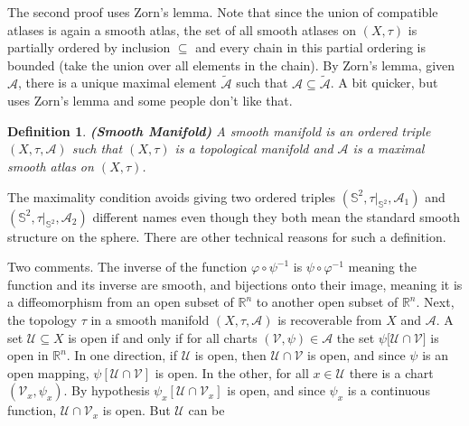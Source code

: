 \documentclass{article}
\theoremstyle{plain}
\theoremstyle{normal}
\newtheorem{definition}{Definition}[section]
\begin{document}
        \par\hfill\par
        The second proof uses Zorn's lemma. Note that since the union of
        compatible atlases is again a smooth atlas, the set of all smooth
        atlases on $(X,\tau)$ is partially ordered by inclusion $\subseteq$
        and every chain in this partial ordering is bounded (take the union
        over all elements in the chain). By Zorn's lemma, given $\mathcal{A}$,
        there is a unique maximal element $\tilde{\mathcal{A}}$ such that
        $\mathcal{A}\subseteq\tilde{\mathcal{A}}$. A bit quicker, but uses
        Zorn's lemma and some people don't like that.
        \begin{definition}{\textbf{(Smooth Manifold)}}
            A smooth manifold is an ordered triple $(X,\tau,\mathcal{A})$
            such that $(X,\tau)$ is a topological manifold and $\mathcal{A}$
            is a maximal smooth atlas on $(X,\tau)$.
        \end{definition}
        The maximality condition avoids giving two ordered triples
        $(\mathbb{S}^{2},\tau|_{\mathbb{S}^{2}},\mathcal{A}_{1})$ and
        $(\mathbb{S}^{2},\tau|_{\mathbb{S}^{2}},\mathcal{A}_{2})$ different
        names even though they both mean the standard smooth structure on the
        sphere. There are other technical reasons for such a definition.
        \par\hfill\par
        Two comments. The inverse of the function $\varphi\circ\psi^{-1}$
        is $\psi\circ\varphi^{-1}$ meaning the function and its inverse are
        smooth, and bijections onto their image, meaning it is a
        diffeomorphism from an open subset of $\mathbb{R}^{n}$ to another open
        subset of $\mathbb{R}^{n}$. Next, the topology $\tau$ in a smooth
        manifold $(X,\tau,\mathcal{A})$ is recoverable from $X$ and
        $\mathcal{A}$. A set $\mathcal{U}\subseteq{X}$ is open if and only if
        for all charts $(\mathcal{V},\psi)\in\mathcal{A}$ the set
        $\psi\big[\mathcal{U}\cap\mathcal{V}]$ is open in $\mathbb{R}^{n}$. In
        one direction, if $\mathcal{U}$ is open, then
        $\mathcal{U}\cap\mathcal{V}$ is open, and since $\psi$ is an open
        mapping, $\psi[\mathcal{U}\cap\mathcal{V}]$ is open. In the other,
        for all $x\in\mathcal{U}$ there is a chart
        $(\mathcal{V}_{x},\psi_{x})$. By hypothesis
        $\psi_{x}[\mathcal{U}\cap\mathcal{V}_{x}]$ is open,
        and since $\psi_{x}$ is a continuous function,
        $\mathcal{U}\cap\mathcal{V}_{x}$ is open. But $\mathcal{U}$ can be
\end{document}

